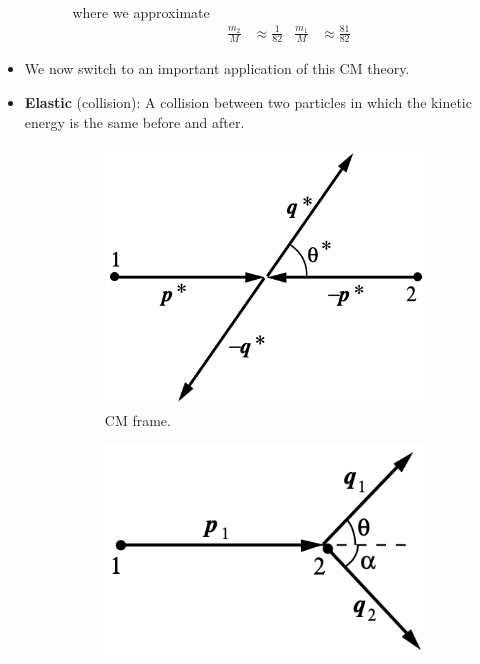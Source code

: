 \documentclass[../notes.tex]{subfiles}
\begin{document}
\begin{itemize}
\begin{itemize}
\begin{itemize}
\begin{align*}
            \end{align*}
            where we approximate
            \begin{align*}
                \frac{m_2}{M} &\approx \frac{1}{82}&
                \frac{m_1}{M} &\approx \frac{81}{82}
            \end{align*}
        \end{itemize}
    \end{itemize}
    \item We now switch to an important application of this CM theory.
    \item \textbf{Elastic} (collision): A collision between two particles in which the kinetic energy is the same before and after.
    \begin{figure}[h!]
        \centering
        \begin{subfigure}[b]{0.35\linewidth}
            \centering
            \includegraphics[width=0.8\linewidth]{../ExtFiles/CMelastica.png}
            \caption{CM frame.}
            \label{fig:CMelastica}
        \end{subfigure}
        \begin{subfigure}[b]{0.35\linewidth}
            \centering
            \includegraphics[width=0.7\linewidth]{../ExtFiles/CMelasticb.png}

\end{subfigure}
\end{figure}
\end{itemize}
\end{document}
